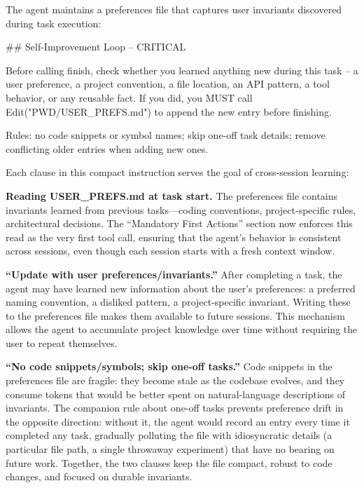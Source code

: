 \documentclass{article}
\begin{document}
The agent maintains a preferences file that captures user invariants discovered during task execution:

\begin{prompt}
## Self-Improvement Loop -- CRITICAL

Before calling finish, check whether you learned
anything new during this task -- a user preference,
a project convention, a file location, an API
pattern, a tool behavior, or any reusable fact. If
you did, you MUST call Edit("PWD/USER_PREFS.md") to
append the new entry before finishing.

Rules: no code snippets or symbol names; skip
one-off task details; remove conflicting older
entries when adding new ones.
\end{prompt}

\noindent Each clause in this compact instruction serves the goal of cross-session learning:

\textbf{Reading USER\_PREFS.md at task start.}  The preferences file contains invariants learned from previous tasks---coding conventions, project-specific rules, architectural decisions.  The ``Mandatory First Actions'' section now enforces this read as the very first tool call, ensuring that the agent's behavior is consistent across sessions, even though each session starts with a fresh context window.

\textbf{``Update with user preferences/invariants.''}  After completing a task, the agent may have learned new information about the user's preferences: a preferred naming convention, a disliked pattern, a project-specific invariant.  Writing these to the preferences file makes them available to future sessions.  This mechanism allows the agent to accumulate project knowledge over time without requiring the user to repeat themselves.

\textbf{``No code snippets/symbols; skip one-off tasks.''}  Code snippets in the preferences file are fragile: they become stale as the codebase evolves, and they consume tokens that would be better spent on natural-language descriptions of invariants.  The companion rule about one-off tasks prevents preference drift in the opposite direction: without it, the agent would record an entry every time it completed any task, gradually polluting the file with idiosyncratic details (a particular file path, a single throwaway experiment) that have no bearing on future work.  Together, the two clauses keep the file compact, robust to code changes, and focused on durable invariants.
\end{document}

